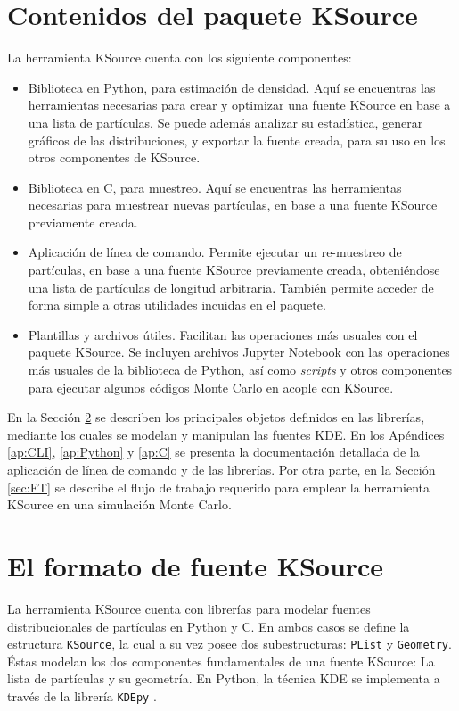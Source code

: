 \section{Contenidos del paquete KSource}

La herramienta KSource cuenta con los siguiente componentes:
\begin{itemize}
	\item Biblioteca en Python, para estimación de densidad. Aquí se encuentras las herramientas necesarias para crear y optimizar una fuente KSource en base a una lista de partículas. Se puede además analizar su estadística, generar gráficos de las distribuciones, y exportar la fuente creada, para su uso en los otros componentes de KSource.
	\item Biblioteca en C, para muestreo. Aquí se encuentras las herramientas necesarias para muestrear nuevas partículas, en base a una fuente KSource previamente creada.
	\item Aplicación de línea de comando. Permite ejecutar un re-muestreo de partículas, en base a una fuente KSource previamente creada, obteniéndose una lista de partículas de longitud arbitraria. También permite acceder de forma simple a otras utilidades incuidas en el paquete.
	\item Plantillas y archivos útiles. Facilitan las operaciones más usuales con el paquete KSource. Se incluyen archivos Jupyter Notebook con las operaciones más usuales de la biblioteca de Python, así como \emph{scripts} y otros componentes para ejecutar algunos códigos Monte Carlo en acople con KSource.
\end{itemize}

En la Sección \ref{sec:libs} se describen los principales objetos definidos en las librerías, mediante los cuales se modelan y manipulan las fuentes KDE. En los Apéndices  \ref{ap:CLI}, \ref{ap:Python} y \ref{ap:C} se presenta la documentación detallada de la aplicación de línea de comando y de las librerías. Por otra parte, en la Sección \ref{sec:FT} se describe el flujo de trabajo requerido para emplear la herramienta KSource en una simulación Monte Carlo.


\section{El formato de fuente KSource}
\label{sec:libs}

La herramienta KSource cuenta con librerías para modelar fuentes distribucionales de partículas en Python y C. En ambos casos se define la estructura \verb|KSource|, la cual a su vez posee dos subestructuras: \verb|PList| y \verb|Geometry|. Éstas modelan los dos componentes fundamentales de una fuente KSource: La lista de partículas y su geometría. En Python, la técnica KDE se implementa a través de la librería \verb|KDEpy| \cite{KDEpy}.


